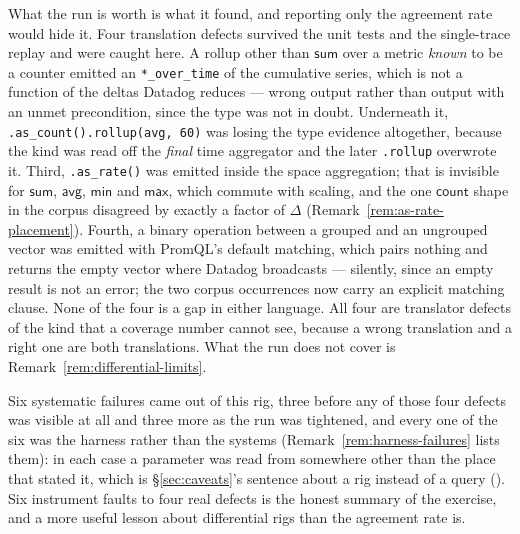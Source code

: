 What the run is worth is what it found, and reporting only the agreement rate would hide
it. Four translation defects survived the unit tests and the single-trace replay and were
caught here. A rollup other than $\mathsf{sum}$ over a metric \emph{known} to be a counter
emitted an \texttt{*\_over\_time} of the cumulative series, which is not a function of the
deltas Datadog reduces --- wrong output rather than output with an unmet precondition,
since the type was not in doubt. Underneath it, \texttt{.as\_count().rollup(avg, 60)} was
losing the type evidence altogether, because the kind was read off the \emph{final} time
aggregator and the later \texttt{.rollup} overwrote it. Third, \texttt{.as\_rate()} was
emitted inside the space aggregation; that is invisible for $\mathsf{sum}$,
$\mathsf{avg}$, $\mathsf{min}$ and $\mathsf{max}$, which commute with scaling, and the
one $\mathsf{count}$ shape in the corpus disagreed by exactly a factor of $\Delta$
(Remark~\ref{rem:as-rate-placement}). Fourth, a binary operation between a grouped and an ungrouped
vector was emitted with PromQL's default matching, which pairs nothing and returns the
empty vector where Datadog broadcasts --- silently, since an empty result is not an
error; the two corpus occurrences now carry an explicit matching clause. None of the four
is a gap in either language. All four are translator defects of the kind that a coverage
number cannot see, because a wrong translation and a right one are both translations.
What the run does not cover is Remark~\ref{rem:differential-limits}.

Six systematic failures came out of this rig, three before any of those four defects was
visible at all and three more as the run was tightened, and every one of the six was the
harness rather than the systems (Remark~\ref{rem:harness-failures} lists them): in each
case a parameter was read from somewhere other
than the place that stated it, which is \S\ref{sec:caveats}'s sentence about a rig
instead of a query (). Six instrument faults to four real defects is the
honest summary of the exercise, and a more useful lesson about differential rigs than the
agreement rate is.

\iffull\fi
\iffull\fi


